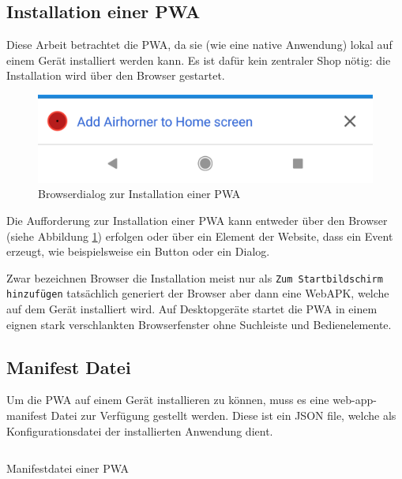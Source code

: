 \subsection{Installation einer PWA}

Diese Arbeit betrachtet die PWA, da sie (wie eine native Anwendung) lokal auf einem Gerät installiert werden kann. Es ist dafür kein zentraler Shop nötig: die Installation wird über den Browser gestartet.

\begin{figure}[h]
        \centering
        \includegraphics[scale=0.2]{img/a2hs-infobar-cropped.png}
        \caption{Browserdialog zur Installation einer PWA \cite{PWAAddToHomeScreenPrompt}}
        \label{fig:pwainstallationprompt}
\end{figure}

Die Aufforderung zur Installation einer PWA kann entweder über den Browser (siehe Abbildung \ref{fig:pwainstallationprompt}) erfolgen oder über ein Element der Website, dass ein Event erzeugt, wie beispielsweise ein Button oder ein Dialog. 

Zwar bezeichnen Browser die Installation meist nur als \texttt{Zum Startbildschirm hinzufügen} tatsächlich generiert der Browser aber dann eine WebAPK, welche auf dem Gerät installiert wird. Auf Desktopgeräte startet die PWA in einem eignen stark verschlankten Browserfenster ohne Suchleiste und Bedienelemente. \cite{GooglePWAInstallation}


\subsection{Manifest Datei}

Um die PWA auf einem Gerät installieren zu können, muss es eine web-app-manifest Datei zur Verfügung gestellt werden. Diese ist ein JSON file, welche als Konfigurationsdatei der installierten Anwendung dient. \cite{GooglePWAManifest}

\begin{listing}[H]
    \inputminted{json}{sourcecode/manifest_sample.json}
    \caption{Manifestdatei einer PWA}
      \label{sourcecode:manifest_sample}
\end{listing}

